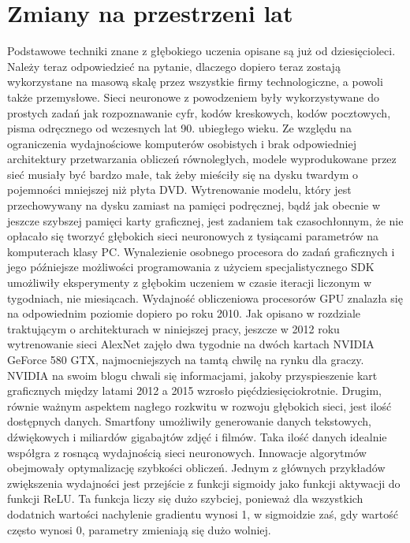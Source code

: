 \documentclass[12pt,a4paper,twoside,titlepage,openright]{book}
\begin{document}
\section{Zmiany na przestrzeni lat}
Podstawowe techniki znane z głębokiego uczenia opisane są już od dziesięcioleci. Należy teraz odpowiedzieć na pytanie, dlaczego dopiero teraz zostają wykorzystane na masową skalę przez wszystkie firmy technologiczne, a powoli także przemysłowe. Sieci neuronowe z powodzeniem były wykorzystywane do prostych zadań jak rozpoznawanie cyfr, kodów kreskowych, kodów pocztowych, pisma odręcznego od wczesnych lat 90. ubiegłego wieku. Ze względu na ograniczenia wydajnościowe komputerów osobistych i brak odpowiedniej architektury przetwarzania obliczeń równoległych, modele wyprodukowane przez sieć musiały być bardzo małe, tak żeby mieściły się na dysku twardym o pojemności mniejszej niż płyta DVD. Wytrenowanie modelu, który jest przechowywany na dysku zamiast na pamięci podręcznej, bądź jak obecnie w jeszcze szybszej pamięci karty graficznej, jest zadaniem tak czasochłonnym, że nie opłacało się tworzyć głębokich sieci neuronowych z tysiącami parametrów na komputerach klasy PC. Wynalezienie osobnego procesora do zadań graficznych i jego późniejsze możliwości programowania z użyciem specjalistycznego SDK umożliwiły eksperymenty z głębokim uczeniem w czasie iteracji liczonym w tygodniach, nie miesiącach. Wydajność obliczeniowa procesorów GPU znalazła się na odpowiednim poziomie dopiero po roku 2010. Jak opisano w rozdziale traktującym o architekturach w niniejszej pracy, jeszcze w 2012 roku wytrenowanie sieci AlexNet zajęło dwa tygodnie na dwóch kartach NVIDIA GeForce 580 GTX, najmocniejszych na tamtą chwilę na rynku dla graczy. NVIDIA na swoim blogu chwali się informacjami, jakoby przyspieszenie kart graficznych między latami 2012 a 2015 wzrosło pięćdziesięciokrotnie. \cite{siteNvidiaAcceleration} Drugim, równie ważnym aspektem nagłego rozkwitu w rozwoju głębokich sieci, jest ilość dostępnych danych. Smartfony umożliwiły generowanie danych tekstowych, dźwiękowych i miliardów gigabajtów zdjęć i filmów. Taka ilość danych idealnie współgra z rosnącą wydajnością sieci neuronowych. Innowacje algorytmów obejmowały optymalizację szybkości obliczeń. Jednym z głównych przykładów zwiększenia wydajności jest przejście z funkcji sigmoidy jako funkcji aktywacji do funkcji ReLU. Ta funkcja liczy się dużo szybciej, ponieważ dla wszystkich dodatnich wartości nachylenie gradientu wynosi 1, w sigmoidzie zaś, gdy wartość często wynosi 0, parametry zmieniają się dużo wolniej.
\end{document}
